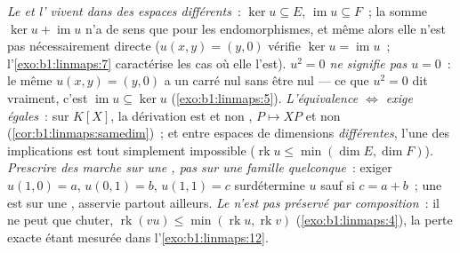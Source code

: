 \begin{remark}
\label{rem:b1:linmaps:pitfalls}
\emph{Le  et l' vivent dans des espaces différents}~: $\ker u
\subseteq E$, $\operatorname{im} u \subseteq F$~; la somme $\ker u
+ \operatorname{im} u$ n'a de sens que pour les endomorphismes, et
même alors elle n'est pas nécessairement directe ($u(x, y) = (y, 0)$ vérifie $\ker u
= \operatorname{im} u$~; l'\cref{exo:b1:linmaps:7} caractérise
les cas où elle l'est).
\emph{$u^2 = 0$ ne signifie pas $u = 0$}~: le même $u(x,y) =
(y, 0)$ a un carré nul sans être nul --- ce que $u^2 = 0$
dit vraiment, c'est $\operatorname{im} u \subseteq \ker u$
(\cref{exo:b1:linmaps:5}).
\emph{L'équivalence  $\iff$  exige 
égales}~: sur $K[X]$, la dérivation est  et non
, $P \mapsto XP$  et non 
(\cref{cor:b1:linmaps:samedim})~; et entre espaces de dimensions
\emph{différentes}, l'une des implications est tout simplement
impossible ($\operatorname{rk} u \leq \min(\dim E, \dim F)$).
\emph{Prescrire des  marche sur une , pas sur une famille quelconque}~:
exiger $u(1, 0) = a$, $u(0, 1) = b$, $u(1, 1) = c$
surdétermine $u$ sauf si $c = a + b$~; une  est  sur une
, asservie partout ailleurs.
\emph{Le  n'est pas préservé par composition}~: il ne peut que chuter,
$\operatorname{rk}(vu) \leq \min(\operatorname{rk} u,
\operatorname{rk} v)$ (\cref{exo:b1:linmaps:4}), la perte exacte étant
mesurée dans l'\cref{exo:b1:linmaps:12}.
\end{remark}

